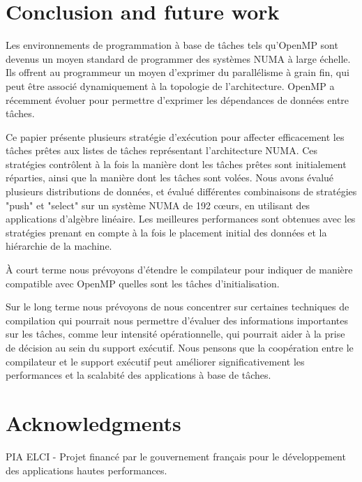 \documentclass[parallelisme]{compas2016}
\begin{document}
\section{Conclusion and future work}

Les environnements de programmation à base de tâches tels qu'OpenMP sont devenus
un moyen standard de programmer des systèmes NUMA à large échelle.
Ils offrent au programmeur un moyen d'exprimer du parallélisme à grain fin,
qui peut être associé dynamiquement à la topologie de l'architecture.
OpenMP a récemment évoluer pour permettre d'exprimer les dépendances de données
entre tâches.

Ce papier présente plusieurs stratégie d'exécution pour affecter efficacement
les tâches prêtes aux listes de tâches représentant l'architecture NUMA.
Ces stratégies contrôlent à la fois la manière dont les tâches prêtes sont
initialement réparties, ainsi que la manière dont les tâches sont volées.
Nous avons évalué plusieurs distributions de données, et évalué différentes
combinaisons de stratégies "push" et "select" sur un système NUMA de 192 cœurs,
en utilisant des applications d'algèbre linéaire.
Les meilleures performances sont obtenues avec les stratégies prenant en compte à
la fois le placement initial des données et la hiérarchie de la machine.

À court terme nous prévoyons d'étendre le compilateur pour indiquer de manière
compatible avec OpenMP quelles sont les tâches d'initialisation.

Sur le long terme nous prévoyons de nous concentrer sur certaines techniques
de compilation qui pourrait nous permettre d'évaluer des informations
importantes sur les tâches, comme leur intensité opérationnelle, qui pourrait
aider à la prise de décision au sein du support exécutif. Nous pensons
que la coopération entre le compilateur et le support exécutif peut améliorer
significativement les performances et la scalabité des applications à base de tâches.

\vspace*{-2ex}
\section*{Acknowledgments}

PIA ELCI - Projet financé par le gouvernement français pour le développement
des applications hautes performances.


\end{document}
